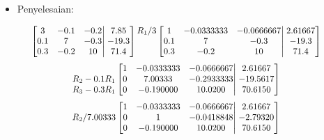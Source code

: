 \documentclass[pdflatex,compress,mathserif]{beamer}
\newcommand*{\Scale}[2][4]{\scalebox{#1}{$#2$}}%
\begin{document}
\begin{frame}
	\begin{itemize}
		\item Penyelesaian:
	\end{itemize}
	\[
	\Scale[0.9]{
	\left[
		\begin{matrix}
			3 & -0.1 & -0.2 \\
			0.1 & 7 & -0.3 \\
			0.3 & -0.2 & 10
		\end{matrix}
	\right|
	\left.
		\begin{matrix}
			7.85 \\ -19.3 \\ 71.4
		\end{matrix}
	\right]
	\begin{matrix}
		R_1 / 3\\
		\\
		\\
	\end{matrix}
	\left[
		\begin{matrix}
			1 & -0.0333333 & -0.0666667 \\
			0.1 & 7 & -0.3 \\
			0.3 & -0.2 & 10
		\end{matrix}
	\right|
	\left.
		\begin{matrix}
			2.61667 \\ -19.3 \\ 71.4
		\end{matrix}
	\right]
	}
	\]
	\[
	\Scale[0.9]{
	\begin{matrix}
		\\
		R_2 - 0.1R_1\\
		R_3 - 0.3R_1
	\end{matrix}
	\left[
		\begin{matrix}
			1 & -0.0333333 & -0.0666667 \\
			0 & 7.00333 & -0.2933333 \\
			0 & -0.190000 & 10.0200
		\end{matrix}
	\right|
	\left.
		\begin{matrix}
			2.61667 \\ -19.5617 \\ 70.6150
		\end{matrix}
	\right]
	}
	\]
	\[
	\Scale[0.9]{
		\begin{matrix}
		\\
		R_2 /7.00333\\
		\\
		\end{matrix}
		\left[
		\begin{matrix}
		1 & -0.0333333 & -0.0666667 \\
		0 & 1 & -0.0418848 \\
		0 & -0.190000 & 10.0200
		\end{matrix}
		\right|
		\left.
		\begin{matrix}
		2.61667 \\ -2.79320 \\ 70.6150
		\end{matrix}
		\right]
	}
	\]
\end{frame}
\end{document}
